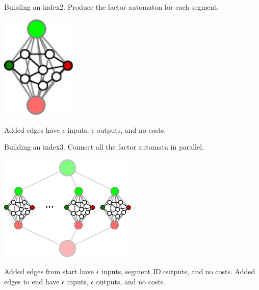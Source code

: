 \begin{frame}{Building an index}{2. Produce the factor automaton for each segment.}
  \begin{center}
    \includegraphics[width=36mm]{figures/factor}
    \end{center}
  \vfill
  Added edges have $\epsilon$ inputs, $\epsilon$ outputs, and no costs.
\end{frame}

\begin{frame}{Building an index}{3. Connect all the factor automata in parallel.}
  \begin{center}
    \includegraphics[width=66mm]{figures/index}
    \end{center}
  \vfill
  Added edges from start have $\epsilon$ inputs, segment ID outputs, and no costs.
  Added edges to end have $\epsilon$ inputs, $\epsilon$ outputs, and no costs.
\end{frame}





